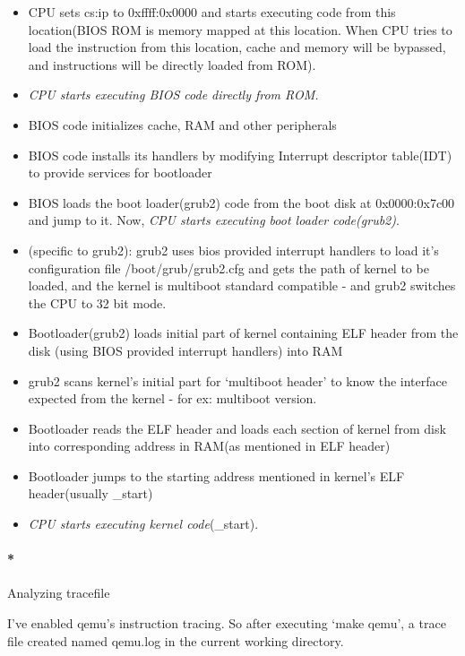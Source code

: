 \documentclass[]{article}
\providecommand{\tightlist}{%
  \setlength{\itemsep}{0pt}\setlength{\parskip}{0pt}}
\let\oldparagraph\paragraph
\renewcommand{\paragraph}[1]{\oldparagraph{#1}\mbox{}}
\begin{document}
\begin{itemize}
\tightlist
\item
  CPU sets cs:ip to 0xffff:0x0000 and starts executing code from this
  location(BIOS ROM is memory mapped at this location. When CPU tries to
  load the instruction from this location, cache and memory will be
  bypassed, and instructions will be directly loaded from ROM).
\item
  \emph{CPU starts executing BIOS code directly from ROM.}
\item
  BIOS code initializes cache, RAM and other peripherals
\item
  BIOS code installs its handlers by modifying Interrupt descriptor
  table(IDT) to provide services for bootloader
\item
  BIOS loads the boot loader(grub2) code from the boot disk at
  0x0000:0x7c00 and jump to it. Now, \emph{CPU starts executing boot
  loader code(grub2)}.
\item
  (specific to grub2): grub2 uses bios provided interrupt handlers to
  load it's configuration file /boot/grub/grub2.cfg and gets the path of
  kernel to be loaded, and the kernel is multiboot standard compatible -
  and grub2 switches the CPU to 32 bit mode.
\item
  Bootloader(grub2) loads initial part of kernel containing ELF header
  from the disk (using BIOS provided interrupt handlers) into RAM
\item
  grub2 scans kernel's initial part for `multiboot header' to know the
  interface expected from the kernel - for ex: multiboot version.
\item
  Bootloader reads the ELF header and loads each section of kernel from
  disk into corresponding address in RAM(as mentioned in ELF header)
\item
  Bootloader jumps to the starting address mentioned in kernel's ELF
  header(usually \_start)
\item
  \emph{CPU starts executing kernel code}(\_start).
\end{itemize}

\paragraph*{Analyzing tracefile}\label{analyzing-tracefile}

I've enabled qemu's instruction tracing. So after executing `make qemu',
a trace file created named qemu.log in the current working directory.
\end{document}
